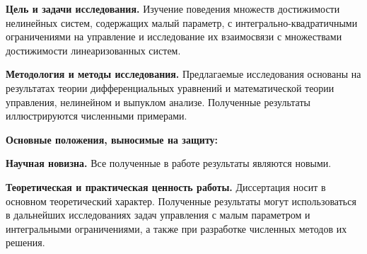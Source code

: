 \textbf{Цель и задачи исследования.} Изучение поведения множеств достижимости нелинейных систем, содержащих малый параметр, с интегрально-квадратичными ограничениями на управление и исследование их взаимосвязи с множествами достижимости линеаризованных систем.

\textbf{Методология и методы исследования.} Предлагаемые исследования основаны на результатах теории дифференциальных уравнений и математической теории управления, нелинейном и выпуклом анализе.
Полученные результаты иллюстрируются численными примерами.

\textbf{Основные положения, выносимые на защиту:} 



\textbf{Научная новизна.} Все полученные в работе результаты являются новыми.

\textbf{Теоретическая и практическая ценность работы.} Диссертация носит в основном теоретический характер.
Полученные результаты могут использоваться в дальнейших исследованиях задач управления с малым параметром и интегральными ограничениями, а также при разработке численных методов их решения.

